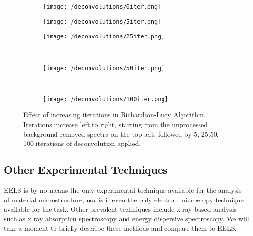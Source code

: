 \begin{figure}

	\begin{subfigure}{0.3 \textwidth}
		\texttt{[image: /deconvolutions/0iter.png]}
	\end{subfigure}
	\hfill
	\begin{subfigure}{0.3 \textwidth}
		\texttt{[image: /deconvolutions/5iter.png]}
	\end{subfigure}
	\hfill
	\begin{subfigure}{0.3 \textwidth}
		\texttt{[image: /deconvolutions/25iter.png]}
	\end{subfigure}
	\\
	\begin{subfigure}{0.33 \textwidth}
		
		\texttt{[image: /deconvolutions/50iter.png]}
	\end{subfigure}
	~
	\begin{subfigure}{0.33 \textwidth}
		
		\texttt{[image: /deconvolutions/100iter.png]}
	\end{subfigure}

	\begin{subfigure}{0.33 \textwidth}
	\end{subfigure}

	\caption{Effect of increasing iterations in Richardson-Lucy Algorithm.  Iterations increase left to right, starting from the unprocessed background removed spectra on the top left, followed by 5, 25,50, 100 iterations of deconvolution applied.  }
	\label{RL_iter}
\end{figure}


\subsection{Other Experimental Techniques}
EELS is by no means the only experimental technique available for the analysis of material microstructure, nor is it even the only electron microscopy technique available for the task. Other prevalent techniques include x-ray based analysis such as x ray absorption spectroscopy and energy dispersive spectroscopy.  We will take a moment to briefly describe these methods and compare them to EELS.

